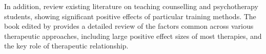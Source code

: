 \documentclass[prodmode,acmtochi]{acmsmall}
\newcommand{\Geraldine}[1]{\textrm{\textbf{\textcolor{Orange}{[[#1]]}}}}
\begin{document}
In addition,  review existing literature on teaching counselling and psychotherapy students, showing significant positive effects of particular training methods. The book edited by  provides a detailed review of the factors common across various therapeutic approaches, including large positive effect sizes of most therapies, and the key role of therapeutic relationship. 






\end{document}
